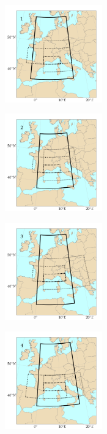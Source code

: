 \documentclass[5p]{elsarticle}
\begin{document}
\begin{figure}[htb]
	\centering
	\begin{subfigure}{.5\columnwidth}
		\centering
		\includegraphics[width=4.2cm]{figures/spatial_win_z4/Spatial_windows_1.png}
	\end{subfigure}%
	\begin{subfigure}{.5\columnwidth}
		\centering
		\includegraphics[width=4.2cm]{figures/spatial_win_z4/Spatial_windows_2.png}
	\end{subfigure}
	\begin{subfigure}{.5\columnwidth}
		\centering
		\includegraphics[width=4.2cm]{figures/spatial_win_z4/Spatial_windows_3.png}
	\end{subfigure}%
	\begin{subfigure}{.5\columnwidth}
		\centering
		\includegraphics[width=4.2cm]{figures/spatial_win_z4/Spatial_windows_4.png}

\end{subfigure}
\end{figure}
\end{document}
